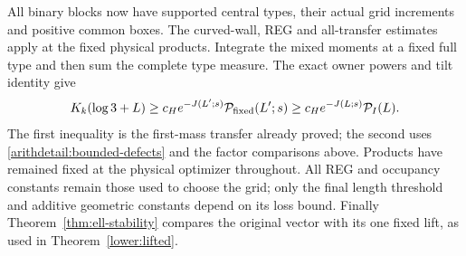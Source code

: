 All binary blocks now have supported central types, their actual grid
increments and positive common boxes. The curved-wall, REG and
all-transfer estimates apply at the fixed physical products. Integrate
the mixed moments at a fixed full type and then sum the complete type
measure. The exact owner powers and tilt identity give
\[
 K_k(\log3+L)\geq
 c_He^{-J(L';s)}\mathcal P_{\rm fixed}(L';s)
 \geq c_He^{-J(L;s)}\mathcal P_I(L).
\]
The first inequality is the first-mass transfer already proved; the
second uses \eqref{arithdetail:bounded-defects} and the factor
comparisons above. Products have remained fixed at the physical
optimizer throughout. All REG and occupancy constants remain those
used to choose the grid; only the final length threshold and additive
geometric constants depend on its loss bound. Finally
Theorem~\ref{thm:ell-stability} compares the original vector with its
one fixed lift, as used in Theorem~\ref{lower:lifted}.

